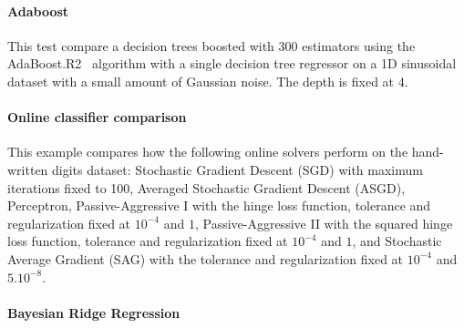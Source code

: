 \documentclass[11pt]{article}
\begin{document}


\paragraph{Adaboost}
This test compare a decision trees boosted with 300 estimators using the AdaBoost.R2~\cite{drucker1997improving} algorithm with
a single decision tree regressor on a 1D sinusoidal dataset with a small amount of Gaussian noise. 
The depth is fixed at 4. 


\paragraph{Online classifier comparison}

This example compares how the following online solvers perform on the hand-written digits dataset:
Stochastic Gradient Descent (SGD) with maximum iterations fixed to 100, 
Averaged Stochastic Gradient Descent (ASGD),
Perceptron, Passive-Aggressive I with the hinge loss function, tolerance 
and regularization fixed at $10^{-4}$ and $1$,
Passive-Aggressive II with the squared hinge loss function, tolerance 
and regularization fixed at $10^{-4}$ and $1$, and Stochastic Average Gradient (SAG)
with the tolerance and regularization fixed at $10^{-4}$ and $5.10^{-8}$.


\paragraph{Bayesian Ridge Regression}
\end{document}
